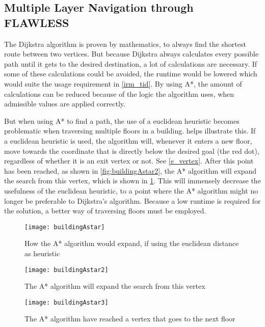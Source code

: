 \subsection{Multiple Layer Navigation through FLAWLESS} \label{multlayhan}

The Dijkstra algorithm is proven by mathematics, to always find the shortest route between two vertices. But because Dijkstra always calculates every possible path until it gets to the desired destination, a lot of calculations are necessary. If some of these calculations could be avoided, the runtime would be lowered which would suite the usage requirement in \cref{irm_tid}. By using A*, the amount of calculations can be reduced because of the logic the algorithm uses, when admissible values are applied correctly.

But when using A* to find a path, the use of a euclidean heuristic becomes problematic when traversing multiple floors in a building.  helps illustrate this. If a euclidean heuristic is used, the algorithm will, whenever it enters a new floor, move towards the coordinate that is directly below the desired goal (the red dot), regardless of whether it is an exit vertex or not. See \cref{e_vertex}. After this point has been reached, as shown in \cref{fig:buildingAstar2}, the A* algorithm will expand the search from this vertex, which is shown in \cref{fig:buildingAstar3}. This will immensely decrease the usefulness of the euclidean heuristic, to a point where the A* algorithm might no longer be preferable to Dijkstra's algorithm. Because a low runtime is required for the solution, a better way of traversing floors must be employed.


\begin{figure}
\centering
  \begin{minipage}{0.45\textwidth}
    \centering
    \texttt{[image: buildingAstar]}
    \caption{How the A* algorithm would expand, if using the euclidean distance as heuristic}
    \label{fig:buildingAstar1}
  \end{minipage}
  \hfill
  \begin{minipage}{0.45\textwidth}
    \centering
    \texttt{[image: buildingAstar2]}
    \caption{The A* algorithm will expand the search from this vertex\newline}
    \label{fig:buildingAstar2}
  \end{minipage}
  \hfill
  \begin{minipage}{0.45\textwidth}
    \raggedright
    \texttt{[image: buildingAstar3]}
    \caption{The A* algorithm have reached a vertex that goes to the next floor}
    \label{fig:buildingAstar3}
  \end{minipage}
\end{figure}


